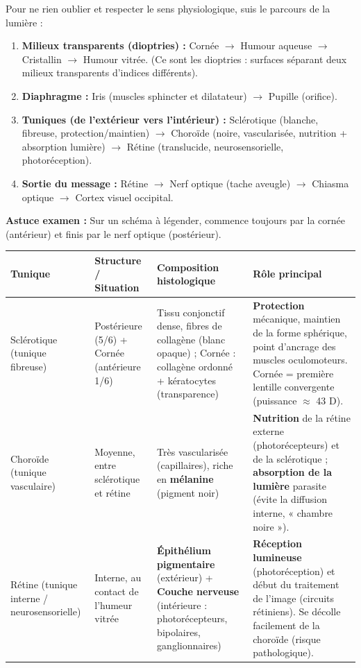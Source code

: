 \documentclass[11pt]{article}
\newcommand{\cle}[1]{{\popxbold\color{popdark}#1}}
\begin{document}
\begin{methode}
Pour ne rien oublier et respecter le sens physiologique, suis le parcours de la lumière :
\begin{enumerate}
\item \textbf{Milieux transparents (dioptries) :} Cornée $\to$ Humour aqueuse $\to$ Cristallin $\to$ Humour vitrée. (Ce sont les \cle{dioptries} : surfaces séparant deux milieux transparents d'indices différents).
\item \textbf{Diaphragme :} Iris (muscles sphincter et dilatateur) $\to$ Pupille (orifice).
\item \textbf{Tuniques (de l'extérieur vers l'intérieur) :} Sclérotique (blanche, fibreuse, protection/maintien) $\to$ Choroïde (noire, vascularisée, nutrition + absorption lumière) $\to$ Rétine (translucide, neurosensorielle, photoréception).
\item \textbf{Sortie du message :} Rétine $\to$ Nerf optique (tache aveugle) $\to$ Chiasma optique $\to$ Cortex visuel occipital.
\end{enumerate}
\textbf{Astuce examen :} Sur un schéma à légender, commence toujours par la cornée (antérieur) et finis par le nerf optique (postérieur).
\end{methode}

\begin{propriete}
\begin{center}
\begin{tabularx}{\linewidth}{|l|X|X|X|}\hline
\rowcolor{popblueL}
\textbf{Tunique} & \textbf{Structure / Situation} & \textbf{Composition histologique} & \textbf{Rôle principal} \\ \hline
\cle{Sclérotique} (tunique fibreuse) & Postérieure (5/6) + Cornée (antérieure 1/6) & Tissu conjonctif dense, fibres de collagène (blanc opaque) ; Cornée : collagène ordonné + kératocytes (transparence) & \textbf{Protection} mécanique, maintien de la forme sphérique, point d'ancrage des muscles oculomoteurs. Cornée = première lentille convergente (puissance $\approx$ 43 D). \\ \hline
\cle{Choroïde} (tunique vasculaire) & Moyenne, entre sclérotique et rétine & Très vascularisée (capillaires), riche en \textbf{mélanine} (pigment noir) & \textbf{Nutrition} de la rétine externe (photorécepteurs) et de la sclérotique ; \textbf{absorption de la lumière} parasite (évite la diffusion interne, « chambre noire »). \\ \hline
\cle{Rétine} (tunique interne / neurosensorielle) & Interne, au contact de l'humeur vitrée & \textbf{Épithélium pigmentaire} (extérieur) + \textbf{Couche nerveuse} (intérieure : photorécepteurs, bipolaires, ganglionnaires) & \textbf{Réception lumineuse} (photoréception) et début du traitement de l'image (circuits rétiniens). Se décolle facilement de la choroïde (risque pathologique). \\ \hline
\end{tabularx}
\end{center}
\end{propriete}
\end{document}

